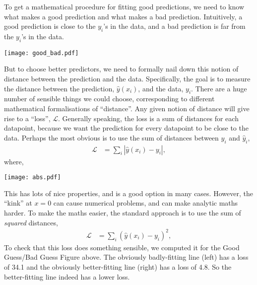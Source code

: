 \documentclass{article}
\newcommand{\yh}{\hat{y}}
\newcommand{\bracket}[3]{\left#1 #3 \right#2}
\renewcommand{\b}{\bracket{(}{)}}
\newcommand{\abs}{\bracket{\lvert}{\rvert}}
\renewcommand{\L}{\mathcal{L}}
\begin{document}
To get a mathematical procedure for fitting good predictions, we need to know what makes a good prediction and what makes a bad prediction.
Intuitively, a good prediction is close to the $y_i$'s in the data, and a bad prediction is far from the $y_i$'s in the data.
\begin{center}
  \texttt{[image: good\_bad.pdf]}
\end{center}
But to choose better predictors, we need to formally nail down this notion of distance between the prediction and the data.
Specifically, the goal is to measure the distance between the prediction, $\yh(x_i)$, and the data, $y_i$.
There are a huge number of sensible things we could choose, corresponding to different mathematical formalisations of ``distance''.
Any given notion of distance will give rise to a ``loss'', $\L$. 
Generally speaking, the loss is a sum of distances for each datapoint, because we want the prediction for every datapoint to be close to the data.
Perhaps the most obvious is to use the sum of distances between $y_i$ and $\yh_i$,
\begin{align}
  \L &= \sum_i \abs{\yh(x_i) - y_i},
\end{align}
where,
\begin{center}
  \texttt{[image: abs.pdf]}
\end{center}
This has lots of nice properties, and is a good option in many cases.
However, the ``kink'' at $x=0$ can cause numerical problems, and can make analytic maths harder.
To make the maths easier, the standard approach is to use the sum of \textit{squared} distances,
\begin{align}
  \L &= \sum_i \b{\yh(x_i) - y_i}^2,
\end{align}
To check that this loss does something sensible, we computed it for the Good Guess/Bad Guess Figure above.  The obviously badly-fitting line (left) has a loss of 34.1 and the obviously better-fitting line (right) has a loss of 4.8.
So the better-fitting line indeed has a lower loss.
\end{document}
